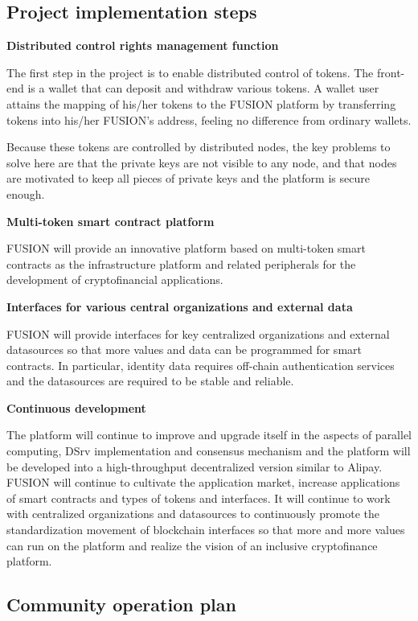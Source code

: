 \documentclass[a4paper,12pt]{article}
\begin{document}
\subsection{Project implementation steps}

\textbf{Distributed control rights management function}

The first step in the project is to enable distributed control of tokens. The front-end is a wallet that can deposit and withdraw various tokens. A wallet user attains the mapping of his/her tokens to the FUSION platform by transferring tokens into his/her FUSION's address, feeling no difference from ordinary wallets.

Because these tokens are controlled by distributed nodes, the key problems to solve here are that the private keys are not visible to any node, and that nodes are motivated to keep all pieces of private keys and the platform is secure enough.

\textbf{Multi-token smart contract platform}

FUSION will provide an innovative platform based on multi-token smart contracts as the infrastructure platform and related peripherals for the development of cryptofinancial applications.

\textbf{Interfaces for various central organizations and external data}

FUSION will provide interfaces for key centralized organizations and external datasources so that more values and data can be programmed for smart contracts. In particular, identity data requires off-chain authentication services and the datasources are required to be stable and reliable.

\textbf{Continuous development}

The platform will continue to improve and upgrade itself in the aspects of parallel computing, DSrv implementation and consensus mechanism and the platform will be developed into a high-throughput decentralized version similar to Alipay. FUSION will continue to cultivate the application market, increase applications of smart contracts and types of tokens and interfaces. It will continue to work with centralized organizations and datasources to continuously promote the standardization movement of blockchain interfaces so that more and more values can run on the platform and realize the vision of an inclusive cryptofinance platform.

\subsection{Community operation plan}
\end{document}
